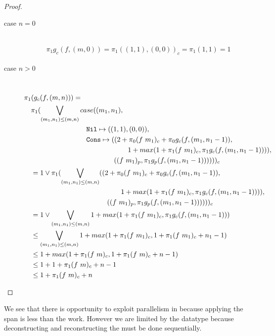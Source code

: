 %
\begin{proof}
  \begin{description}
    \item[case $n=0$]\mbox{}\\[-1.5\baselineskip]
      \begin{align*}
      \pi_1 g_c(f, (m, 0)) = \pi_1((1, 1), (0, 0))_c = \pi_1(1, 1) = 1
      \end{align*}
    \item[case $n>0$]\mbox{}\\[-1.5\baselineskip]
      \[\begin{split}
        &\pi_1(g_c(f, (m, n))) = \\
        &\quad \pi_1(\bigvee\limits_{(m_1, n_1) \leq (m, n)} case((m_1, n_1), \\
        &\quadfive\quadfour \T{Nil} \mapsto ((1, 1), (0, 0)), \\
        &\quadfive\quadfour \T{Cons} \mapsto ((2 + \pi_0(f\ m_1)_c + \pi_0g_c(f, (m_1, n_1-1)), \\
        &\quadfive\quadten                     1 + max(1 + \pi_1(f\ m_1)_c, \pi_1g_c(f, (m_1, n_1-1)))), \\
        &\quadfive\quadeight                  ((f\ m_1)_p, \pi_1 g_p(f, (m_1, n_1-1))))) )_c \\
        &\quad = 1 \vee \pi_1(\bigvee\limits_{(m_1, n_1) \leq (m, n)} ((2 + \pi_0(f\ m_1)_c + \pi_0g_c(f, (m_1, n_1-1)), \\
        &\quadfour\quadten                     1 + max(1 + \pi_1(f\ m_1)_c, \pi_1g_c(f, (m_1, n_1-1)))), \\
        &\quadfour\quadeight                  ((f\ m_1)_p, \pi_1 g_p(f, (m_1, n_1-1))))) )_c \\
        &\quad = 1 \vee \bigvee\limits_{(m_1, n_1) \leq (m, n)} 1 + max(1 + \pi_1 (f\ m_1)_c, \pi_1 g_c(f, (m_1, n_1-1))) \\
        &\quad \leq \bigvee\limits_{(m_1, n_1) \leq (m, n)} 1 + max(1 + \pi_1 (f\ m_1)_c, 1 + \pi_1 (f\ m_1)_c + n_1 - 1) \\
        &\quad \leq 1 + max(1 + \pi_1 (f\ m)_c, 1 + \pi_1 (f\ m)_c + n - 1) \\
        &\quad \leq 1 + 1 + \pi_1 (f\ m)_c + n - 1 \\
        &\quad \leq 1 + \pi_1 (f\ m)_c + n
      \end{split}\]
  \end{description}
\end{proof}
%
We see that there is opportunity to exploit parallelism in  because
applying the span is less than the work. However we are limited by the 
datatype because deconstructing and reconstructing the  must be done
sequentially.

